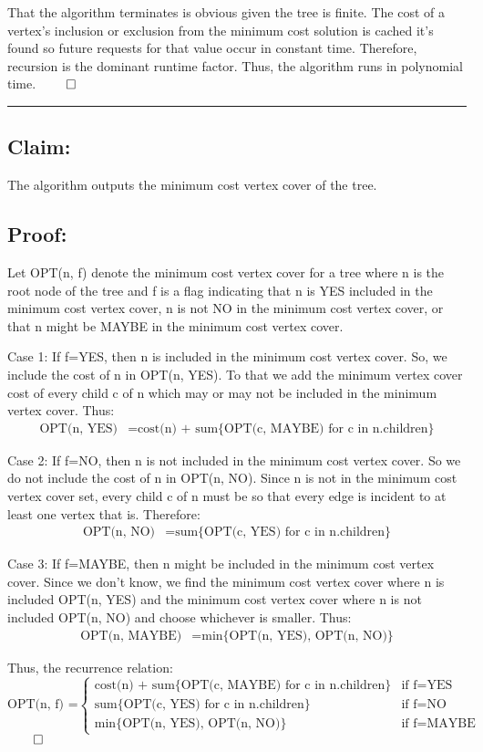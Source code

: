 \documentclass[11pt]{article}
\begin{document}
That the algorithm terminates is obvious given the tree is finite. The cost of a vertex's inclusion or exclusion from the minimum cost solution is cached it's found so future requests for that value occur in constant time. Therefore, recursion is the dominant runtime factor. Thus, the algorithm runs in polynomial time. $\qed$

\noindent\textcolor[RGB]{220,220,220}{\rule{\linewidth}{0.8pt}}

\subsection*{Claim:}

The algorithm outputs the minimum cost vertex cover of the tree. 

\subsection*{Proof:}

Let OPT(n, f) denote the minimum cost vertex cover for a tree where n is the root node of the tree and f is a flag indicating that n is YES included in the minimum cost vertex cover, n is not NO in the minimum cost vertex cover, or that n might be MAYBE in the minimum cost vertex cover.

Case 1: If f=YES, then n is included in the minimum cost vertex cover. So, we include the cost of n in OPT(n, YES). To that we add the minimum vertex cover cost of every child c of n which may or may not be included in the minimum vertex cover. Thus:
\begin{align*}
\text{OPT(n, YES)} &= \text{cost(n) + sum\{OPT(c, MAYBE) for c in n.children\}}
\end{align*}

Case 2: If f=NO, then n is not included in the minimum cost vertex cover. So we do not include the cost of n in OPT(n, NO). Since n is not in the minimum cost vertex cover set, every child c of n must be so that every edge is incident to at least one vertex that is. Therefore:
\begin{align*}
\text{OPT(n, NO)} &= \text{sum\{OPT(c, YES) for c in n.children\}}
\end{align*}

Case 3: If f=MAYBE, then n might be included in the minimum cost vertex cover. Since we don't know, we find the minimum cost vertex cover where n is included OPT(n, YES) and the minimum cost vertex cover where n is not included OPT(n, NO) and choose whichever is smaller. Thus:
\begin{align*}
\text{OPT(n, MAYBE)} &= \text{min\{OPT(n, YES), OPT(n, NO)\}}
\end{align*}

Thus, the recurrence relation:
\[
\text{OPT(n, f) =} 
\begin{cases} 
      \text{cost(n) + sum\{OPT(c, MAYBE) for c in n.children\}} & \text{if f=YES} \\
      \text{sum\{OPT(c, YES) for c in n.children\}} & \text{if f=NO} \\
	  \text{min\{OPT(n, YES), OPT(n, NO)\}} & \text{if f=MAYBE}
\end{cases}
\]
$\qed$
\end{document}
